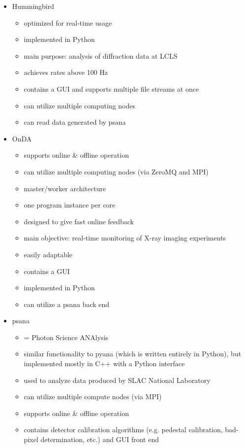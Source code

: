 \documentclass[a4paper]{article}
\begin{document}
{\begin{itemize}
\begin{itemize}
	\end{itemize}
	\item Hummingbird \cite{daurer2016hummingbird}
	\begin{itemize}
		\item optimized for real-time usage
		\item implemented in Python
		\item main purpose: analysis of diffraction data at LCLS
		\item achieves rates above 100 Hz
		\item contains a GUI and supports multiple file streams at once
		\item can utilize multiple computing nodes
		\item can read data generated by psana
	\end{itemize}
	\item OnDA \cite{mariani2016onda}
	\begin{itemize}
		\item supports online \& offline operation
		\item can utilize multiple computing nodes (via ZeroMQ and MPI)
		\item master/worker architecture
		\item one program instance per core
		\item designed to give fast online feedback
		\item main objective: real-time monitoring of X-ray imaging experiments
		\item easily adaptable
		\item contains a GUI
		\item implemented in Python
		\item can utilize a psana back end
	\end{itemize}
	\item psana \cite{damiani2016linac}
	\begin{itemize}
		\item = Photon Science ANAlysis
		\item similar functionality to pyana (which is written entirely in Python), but implemented mostly in C++ with a Python interface
		\item used to analyze data produced by SLAC National Laboratory
		\item can utilize multiple compute nodes (via MPI)
		\item supports online \& offline operation
		\item contains detector calibration algorithms (e.g. pedestal calibration, bad-pixel determination, etc.) and GUI front end

\end{itemize}
\end{itemize}}
\end{document}
